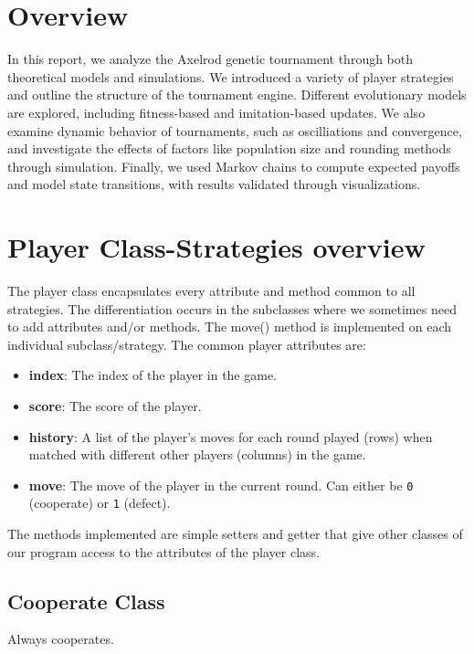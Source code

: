 \documentclass[12pt]{article}
\begin{document}
\tableofcontents

\newpage

\section{Overview}
In this report, we analyze the Axelrod genetic tournament through both theoretical models and simulations. We introduced a variety of player strategies and outline the structure of the tournament engine. Different evolutionary models are explored, including fitness-based and imitation-based updates. We also examine dynamic behavior of tournaments, such as oscilliations and convergence, and investigate the effects of factors like population size and rounding methods through simulation. Finally, we used Markov chains to compute expected payoffs and model state transitions, with results validated through visualizations.
\section{Player Class-Strategies overview}
The player class encapsulates every attribute and method common to all strategies. The differentiation occurs in the subclasses where we sometimes need to add attributes and/or methods. The move() method is implemented on each individual subclass/strategy. The common player attributes are:
\begin{itemize}
    \item \textbf{index}: The index of the player in the game.
    \item \textbf{score}: The score of the player.
    \item \textbf{history}: A list of the player's moves for each round played (rows) when matched with different other players (columns) in the game.
    \item \textbf{move}: The move of the player in the current round. Can either be \texttt{0} (cooperate) or \texttt{1} (defect).
\end{itemize}
The methods implemented are simple setters and getter that give other classes of our program access to the attributes of the player class.

\subsection{Cooperate Class}
Always cooperates.
\end{document}
